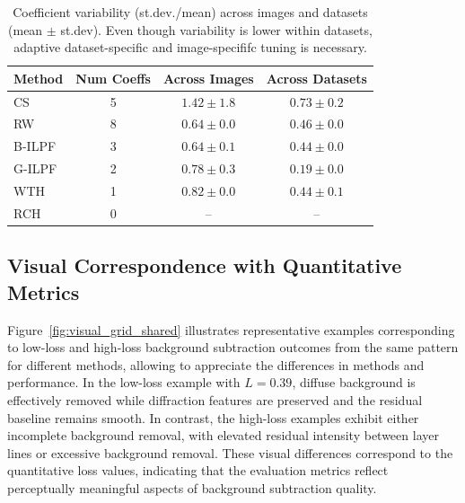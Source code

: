 \documentclass[iucr]{iucrjournals}
\begin{document}
\begin{table}[t]
\centering
\small
\caption{Coefficient variability (st.dev./mean) across images and datasets (mean $\pm$ st.dev). Even though variability is lower within datasets, adaptive dataset-specific and image-specififc tuning is necessary.}
\label{tab:summary_total_variability}
\begin{tabular}{@{}lccc@{}}
\toprule
\textbf{Method} & \textbf{Num Coeffs} & \textbf{Across Images} & \textbf{Across Datasets} \\
\midrule
CS & 5 & $1.42 \pm 1.8$ & $0.73 \pm 0.2$ \\
RW & 8 & $0.64 \pm 0.0$ & $0.46 \pm 0.0$ \\
B-ILPF & 3 & $0.64 \pm 0.1$ & $0.44 \pm 0.0$ \\
G-ILPF & 2 & $0.78 \pm 0.3$ & $0.19 \pm 0.0$ \\
WTH & 1 & $0.82 \pm 0.0$ & $0.44 \pm 0.1$ \\
RCH & 0 & -- & -- \\
\bottomrule
\end{tabular}
\end{table}


\subsection{Visual Correspondence with Quantitative Metrics}

Figure~\ref{fig:visual_grid_shared} illustrates representative examples corresponding to low-loss and high-loss background subtraction outcomes from the same pattern for different methods, allowing to appreciate the differences in methods and performance. In the low-loss example with $L=0.39$, diffuse background is effectively removed while diffraction features are preserved and the residual baseline remains smooth. In contrast, the high-loss examples exhibit either incomplete background removal, with elevated residual intensity between layer lines or excessive background removal. These visual differences correspond to the quantitative loss values, indicating that the evaluation metrics reflect perceptually meaningful aspects of background subtraction quality.


\end{document}
